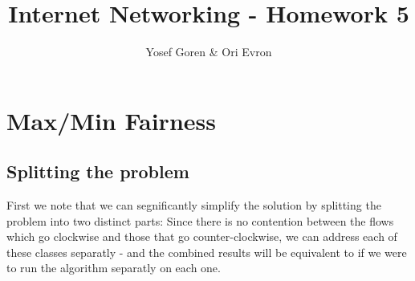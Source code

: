 \documentclass{article}
\begin{document}
\author{Yosef Goren \& Ori Evron}
\title{Internet Networking - Homework 5}
\maketitle
\tableofcontents

\section{Max/Min Fairness}
\subsection{Splitting the problem}
First we note that we can segnificantly simplify the solution by splitting
the problem into two distinct parts: Since there is no contention
between the flows which go clockwise and those that go counter-clockwise,
we can address each of these classes separatly - and the combined results
will be equivalent to if we were to run the algorithm separatly on each one.
\end{document}
